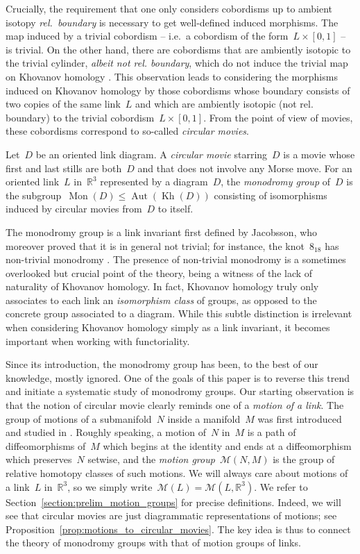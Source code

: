 \documentclass{amsart}
\theoremstyle{definition}
\theoremstyle{definition}
\theoremstyle{definition}
\theoremstyle{definition}
\newcommand{\R}{\mathbb{R}}
\DeclareMathOperator{\Kh}{Kh}
\DeclareMathOperator{\Mon}{Mon}
\DeclareMathOperator{\Aut}{Aut}
\begin{document}
Crucially, the requirement that one only considers cobordisms up to ambient isotopy \emph{rel.~boundary} is necessary to get well-defined induced morphisms. The map induced by a trivial cobordism -- i.e.~a cobordism of the form~$L \times [0,1]$ -- is trivial. On the other hand, there are cobordisms that are ambiently isotopic to the trivial cylinder, \emph{albeit not rel. boundary}, which do not induce the trivial map on Khovanov homology \cite{Jacobsson}. This observation leads to considering the morphisms induced on Khovanov homology by those cobordisms whose boundary consists of two copies of the same link~$L$ and which are ambiently isotopic (not rel. boundary) to the trivial cobordism~$L \times [0,1]$. From the point of view of movies, these cobordisms correspond to so-called \textit{circular movies}.

Let~$D$ be an oriented link diagram. A \textit{circular movie} starring~$D$ is a movie whose first and last stills are both~$D$ and that does not involve any Morse move. For an oriented link~$L$ in~$\R^3$ represented by a diagram~$D$, the \emph{monodromy group} of~$D$ is the subgroup~$\Mon(D) \leq \Aut(\Kh(D))$ consisting of isomorphisms induced by circular movies from~$D$ to itself.


The monodromy group is a link invariant first defined by Jacobsson, who moreover proved that it is in general not trivial; for instance, the knot~$8_{18}$ has non-trivial monodromy \cite{Jacobsson}. The presence of non-trivial monodromy is a sometimes overlooked but crucial point of the theory, being a witness of the lack of naturality of Khovanov homology. In fact, Khovanov homology truly only associates to each link an \emph{isomorphism class} of groups, as opposed to the concrete group associated to a diagram. While this subtle distinction is irrelevant when considering Khovanov homology simply as a link invariant, it becomes important when working with functoriality.

Since its introduction, the monodromy group has been, to the best of our knowledge, mostly ignored. One of the goals of this paper is to reverse this trend and initiate a systematic study of monodromy groups. Our starting observation is that the notion of circular movie clearly reminds one of a \textit{motion of a link}. The group of motions of a submanifold~$N$ inside a manifold~$M$ was first introduced and studied in  \cite{Dahm62,Goldsmith}. Roughly speaking, a motion of~$N$ in~$M$ is a path of diffeomorphisms of~$M$ which begins at the identity and ends at a diffeomorphism which preserves~$N$ setwise, and the \textit{motion group}~$\mathcal{M}(N,M)$ is the group of relative homotopy classes of such motions. We will always care about motions of a link~$L$ in~$\R^3$, so we simply write~$\mathcal{M}(L) = \mathcal{M}(L, \R^3)$. We refer to Section~\ref{section:prelim_motion_groups} for precise definitions. Indeed, we will see that circular movies are just diagrammatic representations of motions; see Proposition~\ref{prop:motions_to_circular_movies}. The key idea is thus to connect the theory of monodromy groups with that of motion groups of links.
\end{document}
